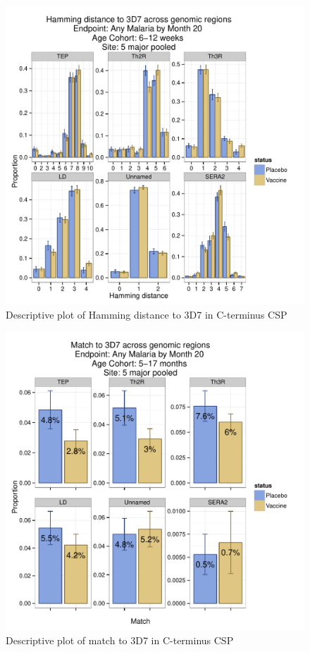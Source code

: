 \documentclass[]{article}
\begin{document}
\begin{figure}[htbp]
\centering
\includegraphics{figures/hamming-newborn-x-1.pdf}
\caption{Descriptive plot of Hamming distance to 3D7 in C-terminus CSP}
\end{figure}

\begin{figure}[htbp]
\centering
\includegraphics{figures/match-infant-x-1.pdf}
\caption{Descriptive plot of match to 3D7 in C-terminus CSP}
\end{figure}
\end{document}
